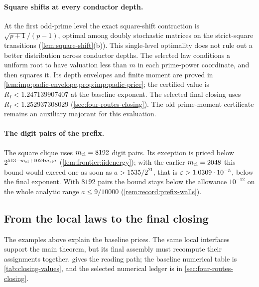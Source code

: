 \paragraph{Square shifts at every conductor depth.}
At the first odd-prime level the exact square-shift contraction is
$\sqrt{p+1}/(p-1)$, optimal among doubly stochastic matrices on the
strict-square transitions (\cref{lem:square-shift}(b)). This single-level
optimality does not rule out a better distribution across conductor depths.
The selected law conditions a uniform root to have valuation less than $m$
in each prime-power coordinate, and then squares it. Its depth envelopes and finite moment are proved in
\cref{lem:imp:padic-envelope,prop:imp:padic-price}; the certified value is
$R_I<1.247139907407$ at the baseline exponent. The selected final closing
uses $R_I<1.252937308029$ (\cref{sec:four-routes-closing}). The old prime-moment
certificate remains an auxiliary majorant for this evaluation.

\paragraph{The digit pairs of the prefix.}
The square clique uses $m_{\mathrm{cl}}=8192$ digit pairs. Its exception is priced below
$2^{513-m_{\mathrm{cl}}+1024m_{\mathrm{cl}} a}$ (\cref{lem:frontier:iidenergy}); with the earlier
$m_{\mathrm{cl}}=2048$ this bound would exceed one as soon as $a>1535/2^{21}$, that is
$\varepsilon>1.0309\cdot10^{-5}$, below the final exponent. With $8192$ pairs the
bound stays below the allowance $10^{-12}$ on the whole analytic range
$a\le9/10000$ (\cref{rem:record:prefix-walls}).

\subsection{From the local laws to the final closing}\label{subsec:walk:glance}

The examples above explain the baseline prices. The same local
interfaces support the main theorem, but its final assembly must
recompute their assignments together.  gives
the reading path; the baseline numerical table is
\cref{tab:closing-values}, and the selected numerical ledger is in
\cref{sec:four-routes-closing}.

